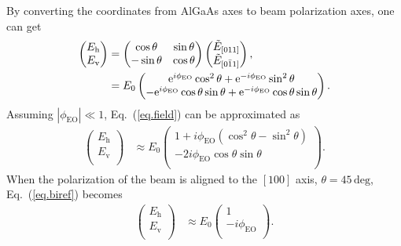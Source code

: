 By converting the coordinates from AlGaAs axes to beam polarization axes, one can get
\begin{align}
    \begin{pmatrix}
    E_{\mathrm{h}} \\ E_{\mathrm{v}} \\
    \end{pmatrix}
    &=
    \begin{pmatrix}
    \cos\theta & \sin\theta  \\ -\sin\theta & \cos\theta \\
    \end{pmatrix}
    \begin{pmatrix}
    \tilde{E}_{[011]} \\ \tilde{E}_{[0\bar{1}1]} \\
    \end{pmatrix}, \notag \\
    &= E_0
    \begin{pmatrix}
    \mathrm{e}^{i\phi_{\mathrm{EO}}}\cos^2\theta + \mathrm{e}^{-i\phi_{\mathrm{EO}}}\sin^2\theta \\
    -\mathrm{e}^{i\phi_{\mathrm{EO}}}\cos\theta\sin\theta + \mathrm{e}^{-i\phi_{\mathrm{EO}}}\cos\theta\sin\theta \\
    \end{pmatrix}.
    \label{eq.field}
\end{align}
Assuming $|\phi_{\mathrm{EO}}|\ll1$, Eq.~(\ref{eq.field}) can be approximated as
\begin{align}
    \begin{pmatrix}
    E_{\mathrm{h}} \\ E_{\mathrm{v}} \\
    \end{pmatrix}
    &\approx E_0
    \begin{pmatrix}
    1 + i\phi_{\mathrm{EO}}(\cos^2\theta - \sin^2\theta) \\ -2i\phi_{\mathrm{EO}}\cos\theta\sin\theta \\
    \end{pmatrix}.
    \label{eq.biref}
\end{align}
When the polarization of the beam is aligned to the $[100]$ axis, $\theta=45\, \mathrm{deg}$, Eq.~(\ref{eq.biref}) becomes
\begin{align}
    \begin{pmatrix}
    E_{\mathrm{h}} \\ E_{\mathrm{v}} \\
    \end{pmatrix}
    &\approx E_0
    \begin{pmatrix}
    1  \\ -i\phi_{\mathrm{EO}} \\
    \end{pmatrix}.
\end{align}
